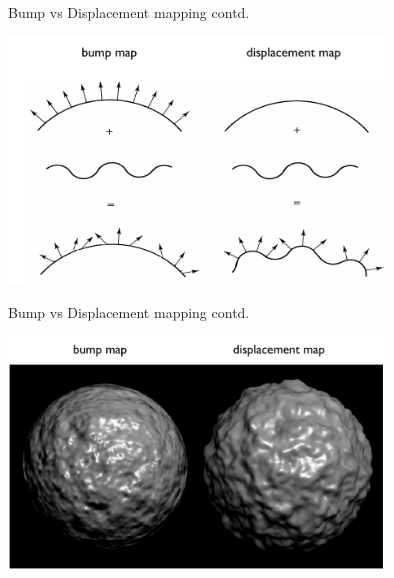 \documentclass[9pt]{beamer}
\begin{document}
%
\begin{frame}{Bump vs Displacement mapping contd.}
	\begin{center}
		\includegraphics[width=10cm]{slike/03_bump_vs_displacement_mapping.png}
	\end{center}
\end{frame}

\begin{frame}{Bump vs Displacement mapping contd.}
	\begin{center}
		\includegraphics[width=10cm]{slike/03_bump_vs_displacement_mapping_a.png}
	\end{center}
\end{frame}
\end{document}
